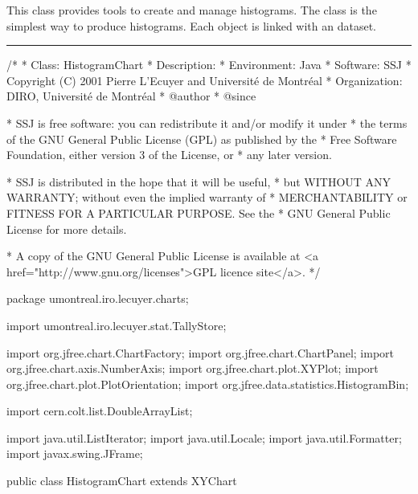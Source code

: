 
This class provides tools to create and manage histograms.
The  class is the simplest way to produce histograms.
Each  object is linked with an
 dataset.

\bigskip\hrule
\begin{code}
\begin{hide}
/*
 * Class:        HistogramChart
 * Description:  
 * Environment:  Java
 * Software:     SSJ 
 * Copyright (C) 2001  Pierre L'Ecuyer and Université de Montréal
 * Organization: DIRO, Université de Montréal
 * @author       
 * @since

 * SSJ is free software: you can redistribute it and/or modify it under
 * the terms of the GNU General Public License (GPL) as published by the
 * Free Software Foundation, either version 3 of the License, or
 * any later version.

 * SSJ is distributed in the hope that it will be useful,
 * but WITHOUT ANY WARRANTY; without even the implied warranty of
 * MERCHANTABILITY or FITNESS FOR A PARTICULAR PURPOSE.  See the
 * GNU General Public License for more details.

 * A copy of the GNU General Public License is available at
   <a href="http://www.gnu.org/licenses">GPL licence site</a>.
 */
\end{hide}
package umontreal.iro.lecuyer.charts;\begin{hide}

import   umontreal.iro.lecuyer.stat.TallyStore;

import   org.jfree.chart.ChartFactory;
import   org.jfree.chart.ChartPanel;
import   org.jfree.chart.axis.NumberAxis;
import   org.jfree.chart.plot.XYPlot;
import   org.jfree.chart.plot.PlotOrientation;
import   org.jfree.data.statistics.HistogramBin;

import   cern.colt.list.DoubleArrayList;

import   java.util.ListIterator;
import   java.util.Locale;
import   java.util.Formatter;
import   javax.swing.JFrame;\end{hide}

public class HistogramChart extends XYChart \begin{hide} {

}
\end{hide}
\end{code}
